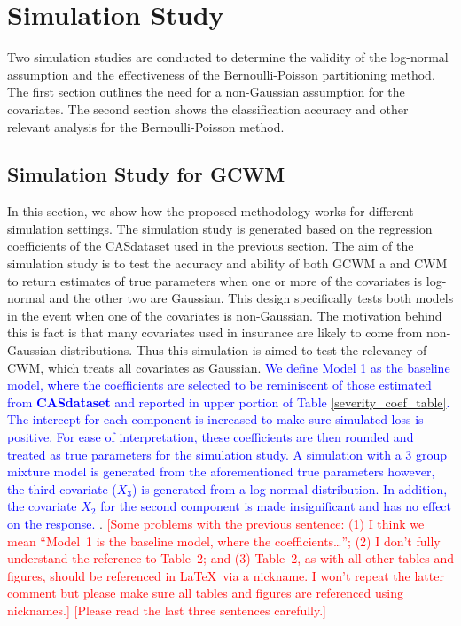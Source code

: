 \documentclass[11pt,letterpaper]{article}
\numberwithin{equation}{section}
\numberwithin{equation}{section}
\numberwithin{equation}{section}
\begin{document}
\section{Simulation Study}\label{sec:sim}

Two simulation studies are conducted to determine the validity of the log-normal assumption and the effectiveness of the Bernoulli-Poisson partitioning method. The first section outlines the need for a non-Gaussian assumption for the covariates. The second section shows the classification accuracy and other relevant analysis for the Bernoulli-Poisson method.


\subsection{Simulation Study for GCWM}


In this section, we show how the proposed methodology works for different simulation settings. The simulation study is generated based on the regression coefficients of the CASdataset used in the previous section. The aim of the simulation study is to test the accuracy and ability of both GCWM a and CWM to return estimates of true parameters when one or more of the covariates is log-normal and the other two are Gaussian. This design specifically tests both models in the event when one of the covariates is non-Gaussian. The motivation behind this is fact is that many covariates used in insurance are likely to come from non-Gaussian distributions. Thus this simulation is aimed to test the relevancy of CWM, which treats all covariates as Gaussian.
\textcolor{blue}{
We define Model 1 as the baseline model, where the coefficients are selected to be reminiscent of those estimated from \textbf{CASdataset} and reported in upper portion of Table \ref{severity_coef_table}. The intercept for each component is increased to make sure simulated loss is positive. For ease of interpretation, these coefficients are then rounded and treated as true parameters for the simulation study.  A simulation with a 3 group mixture model is generated from the aforementioned true parameters however, the third covariate ($X_3$) is generated from a log-normal distribution.  In addition, the covariate $X_2$ for the second component is made insignificant and has no effect on the response. 
}
. \textcolor{red}{[Some problems with the previous sentence: (1) I think we mean ``Model~1 is the baseline model, where the coefficients\ldots''; (2) I don't fully understand the reference to Table~2; and (3) Table~2, as with all other tables and figures, should be referenced in \LaTeX\ via a nickname. I won't repeat the latter comment but please make sure all tables and figures are referenced using nicknames.]} \textcolor{red}{[Please read the last three sentences carefully.]}
\end{document}
